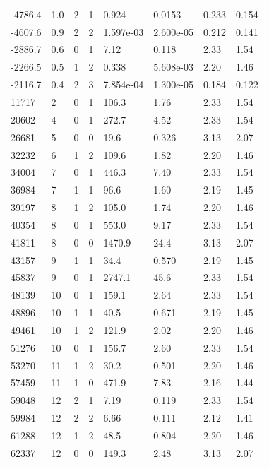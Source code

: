 \documentclass[preview]{standalone}
\begin{document}
{{\begin{tabular}{L{1.2cm}C{1.2cm} C{0.3cm}C{0.5cm} C{1.4cm}C{1.4cm} C{1.4cm}C{1.4cm}}
  -4786.4  &   1.0  & 2     &  1 &  0.924  & 0.0153  & 0.233 &  0.154   \\ 
  -4607.6  &   0.9  & 2     &  2 &  1.597e-03  & 2.600e-05  & 0.212 &  0.141   \\ 
  -2886.7  &   0.6  & 0     &  1 &  7.12  & 0.118  & 2.33 &  1.54   \\ 
  -2266.5  &   0.5  & 1     &  2 &  0.338  & 5.608e-03  & 2.20 &  1.46   \\ 
  -2116.7  &   0.4  & 2     &  3 &  7.854e-04  & 1.300e-05  & 0.184 &  0.122   \\ 
  11717  &     2  & 0     &  1 &  106.3  & 1.76  & 2.33 &  1.54   \\ 
  20602  &     4  & 0     &  1 &  272.7  & 4.52  & 2.33 &  1.54   \\ 
  26681  &     5  & 0     &  0 &  19.6  & 0.326  & 3.13 &  2.07   \\ 
  32232  &     6  & 1     &  2 &  109.6  & 1.82  & 2.20 &  1.46   \\ 
  34004  &     7  & 0     &  1 &  446.3  & 7.40  & 2.33 &  1.54   \\ 
  36984  &     7  & 1     &  1 &  96.6  & 1.60  & 2.19 &  1.45   \\ 
  39197  &     8  & 1     &  2 &  105.0  & 1.74  & 2.20 &  1.46   \\ 
  40354  &     8  & 0     &  1 &  553.0  & 9.17  & 2.33 &  1.54   \\ 
  41811  &     8  & 0     &  0 &  1470.9  & 24.4  & 3.13 &  2.07   \\ 
  43157  &     9  & 1     &  1 &  34.4  & 0.570  & 2.19 &  1.45   \\ 
  45837  &     9  & 0     &  1 &  2747.1  & 45.6  & 2.33 &  1.54   \\ 
  48139  &    10  & 0     &  1 &  159.1  & 2.64  & 2.33 &  1.54   \\ 
  48896  &    10  & 1     &  1 &  40.5  & 0.671  & 2.19 &  1.45   \\ 
  49461  &    10  & 1     &  2 &  121.9  & 2.02  & 2.20 &  1.46   \\ 
  51276  &    10  & 0     &  1 &  156.7  & 2.60  & 2.33 &  1.54   \\ 
  53270  &    11  & 1     &  2 &  30.2  & 0.501  & 2.20 &  1.46   \\ 
  57459  &    11  & 1     &  0 &  471.9  & 7.83  & 2.16 &  1.44   \\ 
  59048  &    12  & 2     &  1 &  7.19  & 0.119  & 2.33 &  1.54   \\ 
  59984  &    12  & 2     &  2 &  6.66  & 0.111  & 2.12 &  1.41   \\ 
  61288  &    12  & 1     &  2 &  48.5  & 0.804  & 2.20 &  1.46   \\ 
  62337  &    12  & 0     &  0 &  149.3  & 2.48  & 3.13 &  2.07   \\ 
\hline 
\end{tabular} 

}}
\end{document}
